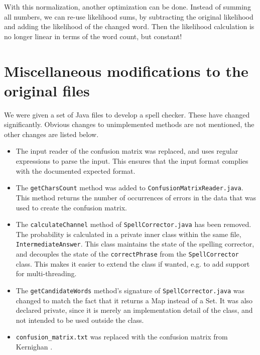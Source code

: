 \documentclass[11pt,a4paper]{article}
\begin{document}
With this normalization, another optimization can be done. Instead of summing all numbers, we can re-use likelihood sums, by subtracting the original likelihood and adding the likelihood of the changed word. Then the likelihood calculation is no longer linear in terms of the word count, but constant!

\section{Miscellaneous modifications to the original files}
We were given a set of Java files to develop a spell checker. These have changed significantly. Obvious changes to unimplemented methods are not mentioned, the other changes are listed below.

\begin{itemize}
\item The input reader of the confusion matrix was replaced, and uses regular expressions to parse the input. This ensures that the input format complies with the documented expected format.
\item The \texttt{getCharsCount} method was added to \texttt{ConfusionMatrixReader.java}. This method returns the number of occurrences of errors in the data that was used to create the confusion matrix.
\item The \texttt{calculateChannel} method of \texttt{SpellCorrector.java}  has been removed. The probability is calculated in a private inner class within the same file, \texttt{IntermediateAnswer}. This class maintains the state of the spelling corrector, and decouples the state of the \texttt{correctPhrase} from the \texttt{SpellCorrector} class. This makes it easier to extend the class if wanted, e.g. to add support for multi-threading.
\item The \texttt{getCandidateWords} method's signature of \texttt{SpellCorrector.java} was changed to match the fact that it returns a Map instead of a Set. It was also declared private, since it is merely an implementation detail of the class, and not intended to be used outside the class.
\item \texttt{confusion\_matrix.txt} was replaced with the confusion matrix from Kernighan \cite{kernighan}.
\end{itemize}
\end{document}
